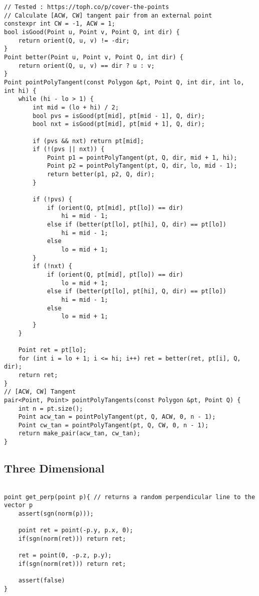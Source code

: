 \documentclass[10pt,a4paper,onesided]{article}
\begin{document}
\begin{multicols*}{3}
\begin{lstlisting}
// Tested : https://toph.co/p/cover-the-points
// Calculate [ACW, CW] tangent pair from an external point
constexpr int CW = -1, ACW = 1;
bool isGood(Point u, Point v, Point Q, int dir) {
    return orient(Q, u, v) != -dir;
}
Point better(Point u, Point v, Point Q, int dir) {
    return orient(Q, u, v) == dir ? u : v;
}
Point pointPolyTangent(const Polygon &pt, Point Q, int dir, int lo, int hi) {
    while (hi - lo > 1) {
        int mid = (lo + hi) / 2;
        bool pvs = isGood(pt[mid], pt[mid - 1], Q, dir);
        bool nxt = isGood(pt[mid], pt[mid + 1], Q, dir);

        if (pvs && nxt) return pt[mid];
        if (!(pvs || nxt)) {
            Point p1 = pointPolyTangent(pt, Q, dir, mid + 1, hi);
            Point p2 = pointPolyTangent(pt, Q, dir, lo, mid - 1);
            return better(p1, p2, Q, dir);
        }

        if (!pvs) {
            if (orient(Q, pt[mid], pt[lo]) == dir)
                hi = mid - 1;
            else if (better(pt[lo], pt[hi], Q, dir) == pt[lo])
                hi = mid - 1;
            else
                lo = mid + 1;
        }
        if (!nxt) {
            if (orient(Q, pt[mid], pt[lo]) == dir)
                lo = mid + 1;
            else if (better(pt[lo], pt[hi], Q, dir) == pt[lo])
                hi = mid - 1;
            else
                lo = mid + 1;
        }
    }

    Point ret = pt[lo];
    for (int i = lo + 1; i <= hi; i++) ret = better(ret, pt[i], Q, dir);
    return ret;
}
// [ACW, CW] Tangent
pair<Point, Point> pointPolyTangents(const Polygon &pt, Point Q) {
    int n = pt.size();
    Point acw_tan = pointPolyTangent(pt, Q, ACW, 0, n - 1);
    Point cw_tan = pointPolyTangent(pt, Q, CW, 0, n - 1);
    return make_pair(acw_tan, cw_tan);
}

\end{lstlisting}
\subsection{Three Dimensional}
\begin{lstlisting}

point get_perp(point p){ // returns a random perpendicular line to the vector p
    assert(sgn(norm(p)));

    point ret = point(-p.y, p.x, 0);
    if(sgn(norm(ret))) return ret;

    ret = point(0, -p.z, p.y);
    if(sgn(norm(ret))) return ret;

    assert(false)
}


\end{lstlisting}
\end{multicols*}
\end{document}
